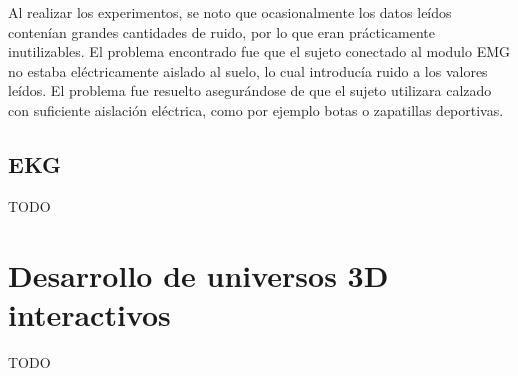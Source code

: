 Al realizar los experimentos, se noto que ocasionalmente los datos leídos contenían grandes cantidades de ruido, por lo que eran prácticamente inutilizables. El problema encontrado fue que el sujeto conectado al modulo EMG no estaba eléctricamente aislado al suelo, lo cual introducía ruido a los valores leídos. El problema fue resuelto asegurándose de que el sujeto utilizara calzado con suficiente aislación eléctrica, como por ejemplo botas o zapatillas deportivas.

\subsection{EKG}

TODO

\section{Desarrollo de universos 3D interactivos}

TODO
